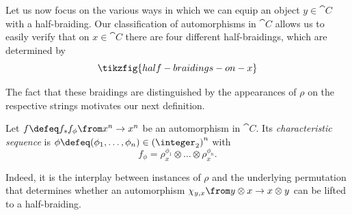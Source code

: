 Let us now focus on the various ways in which we can equip an object \(y \in \cat{C}\) with a half-braiding.
Our classification of automorphisms in \(\cat{C}\) allows us to easily verify that on \(x\in \cat{C}\) there are four different half-braidings,
which are determined by
\[
  \tikzfig{half-braidings-on-x}
\]

The fact that these braidings are distinguished by the appearances of \(\rho\) on the respective strings
motivates our next definition.

\begin{definition}\label{def: characteristic_sequence}
  Let \(f \defeq f_s f_\phi \from x^n \to x^n\) be an automorphism in \(\cat{C}\).
  Its \emph{characteristic sequence} is
  \(\phi \defeq (\phi_1, \dots, \phi_n) \in {\left( \integer_2 \right)}^n\) with
  \[
    f_\phi = \rho_x^{\phi_1}\otimes \dots \otimes \rho_x^{\phi_n}.
  \]
\end{definition}

Indeed, it is the interplay between instances of \(\rho\) and the underlying permutation that determines whether an automorphism \(\chi_{y,x}\from y \otimes x \to x \otimes y\) can be lifted to a half-braiding.

